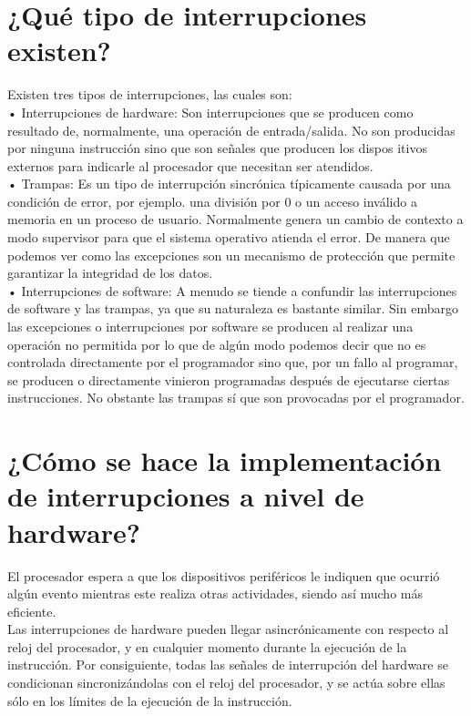 \documentclass{article}
\begin{document}
\section*{¿Qué tipo de interrupciones existen?}
Existen tres tipos de interrupciones, las cuales son:\\

•	Interrupciones de hardware: Son interrupciones que se producen como resultado de, normalmente, una operación de entrada/salida. No son producidas por ninguna instrucción sino que son señales que producen los dispos
itivos externos para indicarle al procesador que necesitan ser atendidos.\\

•	Trampas: Es un tipo de interrupción sincrónica típicamente causada por una condición de error, por ejemplo. una división por 0 o un acceso inválido a memoria en un proceso de usuario. Normalmente genera un cambio de contexto a modo supervisor para que el sistema operativo atienda el error. De manera que podemos ver como las excepciones son un mecanismo de protección que permite garantizar la integridad de los datos.\\


•	Interrupciones de software: A menudo se tiende a confundir las interrupciones de software y las trampas, ya que su naturaleza es bastante similar. Sin embargo las excepciones o interrupciones por software se producen al realizar una operación no permitida por lo que de algún modo podemos decir que no es controlada directamente por el programador sino que, por un fallo al programar, se producen o directamente vinieron programadas después de ejecutarse ciertas instrucciones. No obstante las trampas sí que son provocadas por el programador.\\

\section*{¿Cómo se hace la implementación de interrupciones a nivel de hardware?}

El procesador espera a que los dispositivos periféricos le indiquen que ocurrió algún evento mientras este realiza otras actividades, siendo así mucho más eficiente.\\
Las interrupciones de hardware pueden llegar asincrónicamente con respecto al reloj del procesador, y en cualquier momento durante la ejecución de la instrucción. Por consiguiente, todas las señales de interrupción del hardware se condicionan sincronizándolas con el reloj del procesador, y se actúa sobre ellas sólo en los límites de la ejecución de la instrucción. 
\end{document}
